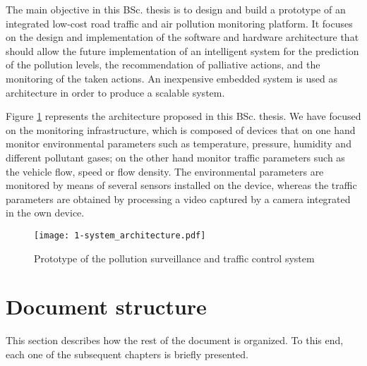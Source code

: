 The main objective in this \ac{BSc.} thesis is to design and build a prototype of an integrated low-cost road traffic and air pollution monitoring platform. It focuses on the design and implementation of the software and hardware architecture that should allow the future implementation of an intelligent system for the prediction of the pollution levels, the recommendation of palliative actions, and the monitoring of the taken actions. An inexpensive embedded system is used as architecture in order to produce a scalable system.

Figure \ref{fig:1-system_architecture} represents the architecture proposed in this \ac{BSc.} thesis. We have focused on the monitoring infrastructure, which is composed of devices that on one hand monitor environmental parameters such as temperature, pressure, humidity and different pollutant gases; on the other hand monitor traffic parameters such as the vehicle flow, speed or flow density. The environmental parameters are monitored by means of several sensors installed on the device, whereas the traffic parameters are obtained by processing a video captured by a camera integrated in the own device.

\begin{figure}[!h]
	\begin{center}
		\texttt{[image: 1-system\_architecture.pdf]}	
		\caption{Prototype of the pollution surveillance and traffic control system}
		\label{fig:1-system_architecture}
	\end{center}
\end{figure}


\newpage
\section{Document structure}

This section describes how the rest of the document is organized. To this end, each one of the subsequent chapters is briefly presented.

